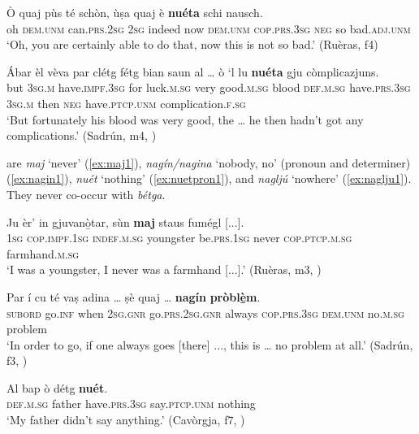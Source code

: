 \ea
\label{ex:nueta2}
	\gll Ò quaj pùs té schòn, ùṣa quaj è \textbf{nuéta} schi nausch.\\
oh \textsc{dem.unm} can.\textsc{prs.2sg} \textsc{2sg} indeed now \textsc{dem.unm} \textsc{cop.prs.3sg} \textsc{neg} so bad.\textsc{adj.unm}\\
\glt `Oh, you are certainly able to do that, now this is not so bad.' (Ruèras, f4)
\z

\ea
\label{ex:nueta3}
\gll  Ábar èl vèva par clétg fétg bian saun al … ò `l lu \textbf{nuéta} gju còmplicazjuns.  \\
but  \textsc{3sg.m} have.\textsc{impf.3sg} for luck.\textsc{m.sg} very good.\textsc{m.sg} blood \textsc{def.m.sg} {} have.\textsc{prs.3sg} \textsc{3sg.m} then \textsc{neg} have.\textsc{ptcp.unm} complication.\textsc{f.sg}\\
\glt `But fortunately his blood was very good, the … he then hadn’t got any complications.' (Sadrún, m4, )
\z

 are \textit{maj} `never' (\ref{ex:maj1}), \textit{nagín/nagina} `nobody, no' (pronoun and determiner) (\ref{ex:nagin1}), \textit{nuét} `nothing' (\ref{ex:nuetpron1}), and \textit{nagljú} `nowhere' (\ref{ex:naglju1}). They never co-occur with \textit{bétga}.

\ea
\label{ex:maj1}
\gll Ju èr’ in gjuvanò̱tar, sùn \textbf{maj} staus fumégl [...].\\
\textsc{1sg} \textsc{cop.impf.1sg} \textsc{indef.m.sg} youngster be.\textsc{prs.1sg} never \textsc{cop.ptcp.m.sg} farmhand.\textsc{m.sg} \\
\glt `I was a youngster, I never was a farmhand [...].' (Ruèras, m3, )
\z

\ea
\label{ex:nagin1}
\gll  Par í cu té vaṣ adina … ṣè quaj … \textbf{nagín} \textbf{pròblè̱m}.  \\
\textsc{subord} go.\textsc{inf} when \textsc{2sg.gnr} go.\textsc{prs.2sg.gnr} always {} \textsc{cop.prs.3sg} \textsc{dem.unm} {} no.\textsc{m.sg} problem \\
\glt `In order to go, if one always goes [there] ..., this is … no problem at all.' (Sadrún, f3, )
\z

\ea
\label{ex:nuetpron1}
	\gll Al bap ò détg \textbf{nuét}.\\
\textsc{def.m.sg} father have.\textsc{prs.3sg} say.\textsc{ptcp.unm} nothing\\
\glt `My father didn't say anything.' (Cavòrgja, f7, )
\z

